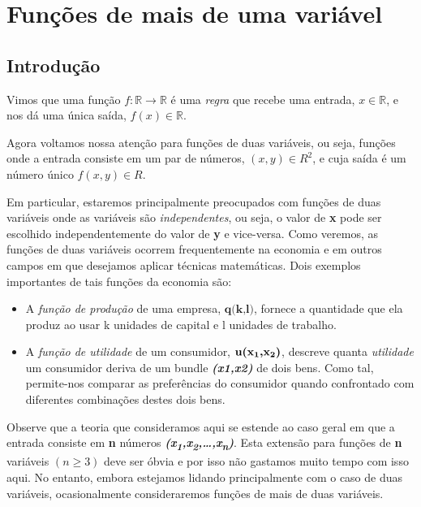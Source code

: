 \documentclass[a4paper]{article}
\begin{document}
\section{Funções de mais de uma variável}
\subsection*{Introdução}
\par Vimos que uma função $f:\mathbb{R}\rightarrow\mathbb{R}$ é uma \textit{regra} que recebe uma entrada, $x\in\mathbb{R}$, e nos dá uma única saída, $f(x)\in \mathbb{R}.$
\par Agora voltamos nossa atenção para funções de duas variáveis, ou seja, funções onde a entrada consiste em um par de números, $(x,y)\in{R}^2$, e cuja saída é um número único $f(x,y)\in{R}.$
\par Em particular, estaremos principalmente preocupados com funções de duas variáveis onde as variáveis são \textit{independentes}, ou seja, o valor de \textbf{x} pode ser escolhido independentemente do valor de \textbf{y} e vice-versa. Como veremos, as funções de duas variáveis ocorrem frequentemente na economia e em outros campos em que desejamos aplicar técnicas matemáticas. Dois exemplos importantes de tais funções da economia são:
\begin{itemize}
    \item A \textit{função de produção} de uma empresa, \textit{$\textbf{q(k,l)}$}, fornece a quantidade que ela produz ao usar k unidades de capital e l unidades de trabalho.
    \item A \textit{função de utilidade} de um consumidor, \textit{$\textbf{u(x\textsubscript{1},x\textsubscript{2})}$}, descreve quanta \textit{utilidade} um consumidor deriva de um bundle \textit{\textbf{(x1,x2)}} de dois bens. Como tal, permite-nos comparar as preferências do consumidor quando confrontado com diferentes combinações destes dois bens.
\end{itemize}
\par Observe que a teoria que consideramos aqui se estende ao caso geral em que a entrada consiste em \textbf{n} números \textit{\textbf{(x\textsubscript{1},x\textsubscript{2},…,x\textsubscript{n})}}. Esta extensão para funções de \textbf{n} variáveis $(n \geq 3)$  deve ser óbvia e por isso não gastamos muito tempo com isso aqui. No entanto, embora estejamos lidando principalmente com o caso de duas variáveis, ocasionalmente consideraremos funções de mais de duas variáveis.
\end{document}
